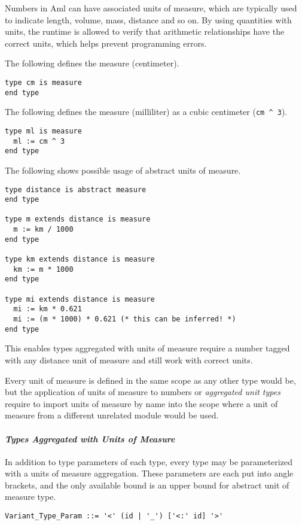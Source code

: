 Numbers in Aml can have associated units of measure, which are typically used to indicate length, volume, mass, distance and so on. By using quantities with units, the runtime is allowed to verify that arithmetic relationships have the correct units, which helps prevent programming errors. 

\example The following defines the measure  (centimeter).
\begin{lstlisting}
type cm is measure
end type
\end{lstlisting}

\example The following defines the measure  (milliliter) as a cubic centimeter (\lstinline!cm ^ 3!).
\begin{lstlisting}
type ml is measure
  ml := cm ^ 3
end type
\end{lstlisting}

\example The following shows possible usage of abstract units of measure. 
\begin{lstlisting}
type distance is abstract measure
end type

type m extends distance is measure
  m := km / 1000
end type

type km extends distance is measure
  km := m * 1000
end type

type mi extends distance is measure
  mi := km * 0.621
  mi := (m * 1000) * 0.621 (* this can be inferred! *)
end type
\end{lstlisting}
This enables types aggregated with units of measure require a number tagged with any distance unit of measure and still work with correct units. 

Every unit of measure is defined in the same scope as any other type would be, but the application of units of measure to numbers or {\em aggregated unit types} require to import units of measure by name into the scope where a unit of measure from a different unrelated module would be used. 

\paragraph{\em Types Aggregated with Units of Measure}
In addition to type parameters of each type, every type may be parameterized with a units of measure aggregation. These parameters are each put into angle brackets, and the only available bound is an upper bound for abstract unit of measure type. 

\syntax\begin{lstlisting}[mathescape=false]
Variant_Type_Param ::= '<' (id | '_') ['<:' id] '>'
\end{lstlisting}

